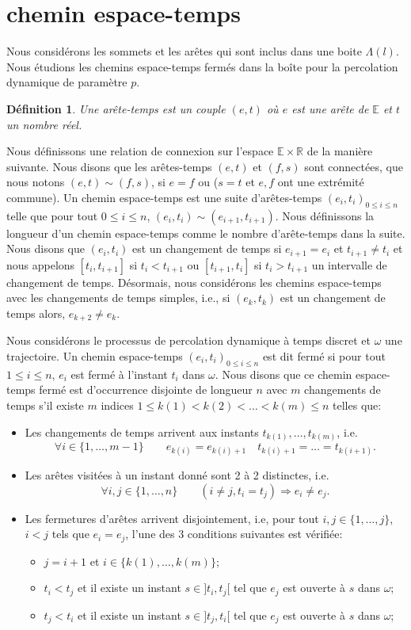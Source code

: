\documentclass[titlepage,a4paper,12pt]{article}
\newcounter{d}
\newcounter{t}
\newcounter{p}
\newcounter{c}
\newcounter{a}
\newcounter{l}
\newtheorem{defi}[d]{Définition}
\begin{document}
\section{chemin espace-temps}
Nous considérons les sommets et les arêtes qui sont inclus dans une boite $\Lambda(l)$. Nous étudions les chemins espace-temps fermés dans la boîte pour la percolation dynamique de paramètre $p$.
\begin{defi}
Une arête-temps est un couple $(e,t)$ où $e$ est une arête de $\mathbb{E}$ et $t$ un nombre réel. 
\end{defi}

Nous définissons une relation de connexion sur l'espace $\mathbb{E}\times \mathbb{R}$ de la manière suivante. Nous disons que les arêtes-temps $(e,t)$ et $(f,s)$ sont connectées, que nous notons $(e,t)\sim(f,s)$, si $e=f$ ou ($s=t$ et $e,f$ ont une extrémité commune). Un chemin espace-temps est une suite d'arêtes-temps $(e_i,t_i)_{0\leqslant i\leqslant n}$ telle que pour tout $ 0\leqslant i \leqslant n$, $(e_i,t_i)\sim(e_{i+1},t_{i+1})$. Nous définissons la longueur d'un chemin espace-temps comme le nombre d'arête-temps dans la suite. Nous disons que $(e_i,t_i)$ est un changement de temps si $e_{i+1} = e_i$ et $t_{i+1}\neq t_i$ et nous appelons $[t_i,t_{i+1}]$ si $t_i<t_{i+1}$ ou $[t_{i+1},t_i]$ si $t_i> t_{i+1}$ un intervalle de changement de temps. Désormais, nous considérons les chemins espace-temps avec les changements de temps simples, i.e., si $(e_k,t_k)$ est un changement de temps alors, $e_{k+2} \neq e_k$.

Nous considérons le processus de percolation dynamique à temps discret et $\omega$ une trajectoire. Un chemin espace-temps $(e_i,t_i)_{0\leqslant i \leqslant n}$ est dit fermé si pour tout $1\leqslant i\leqslant n$, $e_i$ est fermé à l'instant $t_i$ dans $\omega$. Nous disons que ce chemin espace-temps fermé est d'occurrence disjointe de longueur $n$ avec $m$ changements de temps s'il existe $m$ indices $1\leqslant k(1)< k(2) < \dots < k(m) \leqslant n$ telles que:
\begin{itemize}[label = $\bullet$, leftmargin = *]
\item Les changements de temps arrivent aux instants $t_{k(1)},\dots, t_{k(m)}$, i.e.
$$\forall i\in \{1,\dots, m-1\} \qquad e_{k(i)} = e_{k(i)+1} \quad t_{k(i)+1} =\dots = t_{k(i+1)}.
$$
\item Les arêtes visitées à un instant donné sont 2 à 2 distinctes, i.e.
$$ \forall i,j \in \{1,\dots, n\} \qquad (i\neq j, t_i = t_j) \Rightarrow e_i\neq e_j.
$$
\item Les fermetures d'arêtes arrivent disjointement, i.e, pour tout $i,j\in \{1,\dots, j\}$, $i<j$ tels que $e_i = e_j$, l'une des 3 conditions suivantes est vérifiée:
\begin{itemize}[label=$\bullet$]
\item $j=i+1$ et $i\in \{k(1),\dots, k(m)\}$;
\item $t_i< t_j$ et il existe un instant $s\in ]t_i,t_j[$ tel que $e_j$ est ouverte à $s$ dans $\omega$;
\item $t_j< t_i$ et il existe un instant $s\in ]t_j,t_i[$ tel que $e_j$ est ouverte à $s$ dans $\omega$;
\end{itemize}
\end{itemize}
\end{document}
